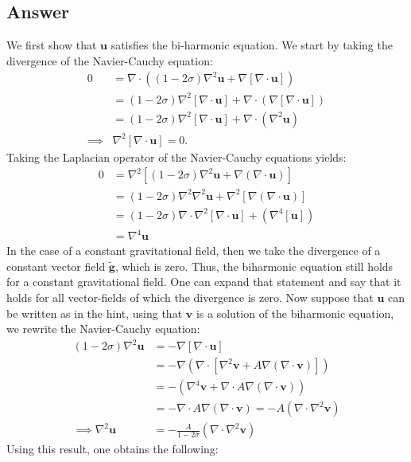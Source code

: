 \documentclass{article}
\newcommand{\laplace}{\nabla^2}
\begin{document}
\subsection*{Answer}
We first show that $\mathbf{u}$ satisfies the bi-harmonic equation. We start by taking the divergence of the Navier-Cauchy equation:
\begin{align*}
    0 &= \nabla\cdot\left((1-2\sigma)\laplace\mathbf{u} + \nabla\left[\nabla\cdot \mathbf{u}\right]\right)\\
    &= (1-2\sigma)\laplace\left[\nabla\cdot\mathbf{u}\right] + \nabla\cdot\left(\nabla\left[\nabla\cdot \mathbf{u}\right]\right)\\
    &= (1-2\sigma)\laplace\left[\nabla\cdot\mathbf{u}\right] + \nabla\cdot\left(\laplace\mathbf{u}\right)\\
    \implies& \laplace\left[\nabla\cdot\mathbf{u}\right] = 0.
\end{align*}Taking the Laplacian operator of the Navier-Cauchy equations yields:
\begin{align*}
    0 &= \laplace\left[(1-2\sigma)\laplace\mathbf{u} + \nabla\left(\nabla\cdot \mathbf{u}\right)\right]\\
    &= (1-2\sigma)\laplace\laplace\mathbf{u} + \laplace\left[\nabla\left(\nabla\cdot \mathbf{u}\right)\right]\\
    &= (1-2\sigma)\nabla\cdot\laplace\left[\nabla\cdot\mathbf{u}\right] + \left(\nabla^4\left[\mathbf{u}\right]\right)\\
    &= \nabla^4\mathbf{u}
\end{align*} In the case of a constant gravitational field, then we take the divergence of a constant vector field $\tilde{\mathbf{g}}$, which is zero. Thus, the biharmonic equation still holds for a constant gravitational field.
One can expand that statement and say that it holds for all vector-fields of which the divergence is zero.
Now suppose that $\mathbf{u}$ can be written as in the hint, using that $\mathbf{v}$ is a solution of the biharmonic equation, we rewrite the Navier-Cauchy equation:
\begin{align*}
    (1-2\sigma)\laplace{\mathbf{u}} &=- \nabla\left[\nabla\cdot\mathbf{u}\right]\\
    &= -\nabla\left(\nabla\cdot\left[\laplace{\mathbf{v}} + A\nabla\left(\nabla\cdot\mathbf{v}\right)\right]\right)\\
    &= -\left(\nabla^4\mathbf{v} + \nabla\cdot A\nabla(\nabla\cdot\mathbf{v})\right)\\
    &= -\nabla\cdot A\nabla(\nabla\cdot\mathbf{v}) = -A\left(\nabla\cdot\laplace\mathbf{v}\right)\\
    \implies \laplace{\mathbf{u}} &= -\frac{A}{1-2\sigma}\left(\nabla\cdot\laplace\mathbf{v}\right)
\end{align*}Using this result, one obtains the following:
\end{document}
